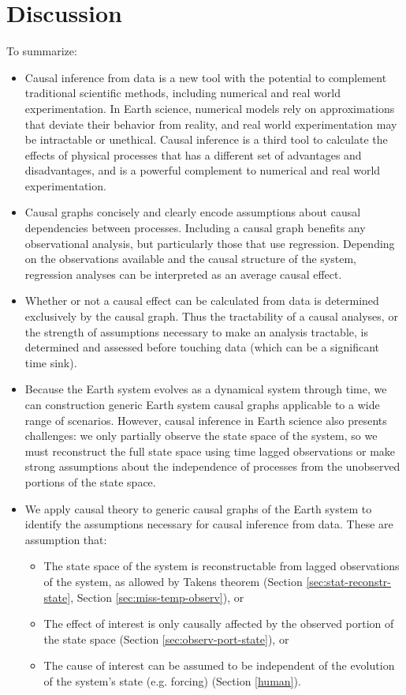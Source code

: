 \documentclass[12pt]{article}
\begin{document}
\section{Discussion}

To summarize:

\begin{itemize}
\item Causal inference from data is a new tool with the potential to
  complement traditional scientific methods, including numerical and
  real world experimentation. In Earth science, numerical models rely
  on approximations that deviate their behavior from reality, and real
  world experimentation may be intractable or unethical. Causal
  inference is a third tool to calculate the effects of physical
  processes that has a different set of advantages and
  disadvantages, and is a powerful complement to numerical and real
  world experimentation.
\item Causal graphs concisely and clearly encode assumptions about
  causal dependencies between processes. Including a causal graph
  benefits any observational analysis, but particularly those that use
  regression. Depending on the observations available and the causal
  structure of the system, regression analyses can be interpreted as
  an average causal effect.
\item Whether or not a causal effect can be calculated from data is
  determined exclusively by the causal graph. Thus the tractability of
  a causal analyses, or the strength of assumptions necessary to make
  an analysis tractable, is determined and assessed before touching
  data (which can be a significant time sink).
\item Because the Earth system evolves as a dynamical system through
  time, we can construction generic Earth system causal graphs
  applicable to a wide range of scenarios. However, causal inference
  in Earth science also presents challenges: we only partially observe
  the state space of the system, so we must reconstruct the full state
  space using time lagged observations or make strong assumptions
  about the independence of processes from the unobserved portions of
  the state space.
\item We apply causal theory to generic causal graphs of the Earth
  system to identify the assumptions necessary for causal inference
  from data. These are assumption that:
  \begin{itemize}
  \item The state space of the system is reconstructable
    from lagged observations of the system, as allowed by
    Takens theorem (Section \ref{sec:stat-reconstr-state}, Section \ref{sec:miss-temp-observ}), or
  \item The effect of interest is only causally
    affected by the observed portion of the state space (Section
    \ref{sec:observ-port-state}), or
  \item The cause of interest can be assumed to be independent of the
    evolution of the system's state (e.g. forcing) (Section
    \ref{human}).
  \end{itemize}
\end{itemize}
\end{document}
